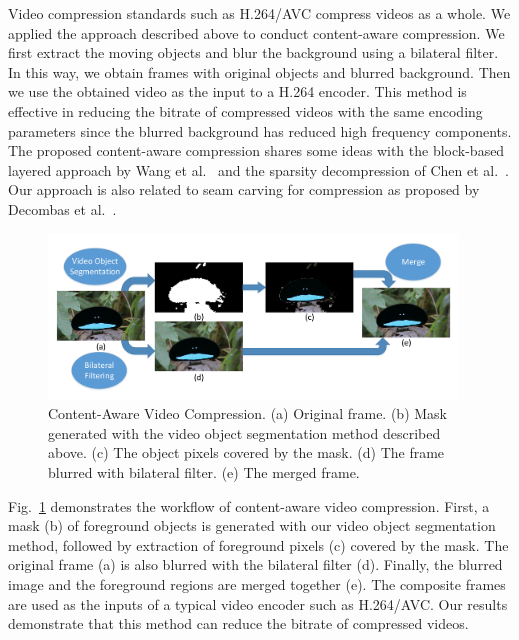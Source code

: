 Video compression standards such as H.264/AVC compress videos as a whole. We applied the approach described above to conduct content-aware compression. We first extract the moving objects and blur the background using a bilateral filter. In this way, we obtain frames with original objects and blurred background. Then we use the obtained video as the input to a H.264 encoder. This method is effective in reducing the bitrate of compressed videos with the same encoding parameters since the blurred background has reduced high frequency components.
The proposed content-aware compression shares some ideas with the block-based layered approach by Wang et al.~\cite{wang2012} and the sparsity decompression of Chen et al.~\cite{Chen2015}. Our approach is also related to seam carving for compression as proposed by Decombas et al.~\cite{decombas2012}.

\begin{figure}
	\centering
	\includegraphics[width=0.97\textwidth]{figures/compression_workflow.pdf}
	\caption{Content-Aware Video Compression. (a) Original frame. (b) Mask generated with the video object segmentation method described above. (c) The object pixels covered by the mask. (d) The frame blurred with bilateral filter. (e) The merged frame.} 
	\label{fig-comp-wf}
\end{figure}

Fig.~\ref{fig-comp-wf} demonstrates the workflow of content-aware video compression. First, a mask (b) of foreground objects is generated with our video object segmentation method, followed by extraction of foreground pixels (c) covered by the mask. The original frame (a) is also blurred with the bilateral filter (d). Finally, the blurred image and the foreground regions are merged together (e). The composite frames are used as the inputs of a typical video encoder such as H.264/AVC. Our results demonstrate that this method can reduce the bitrate of compressed videos.

